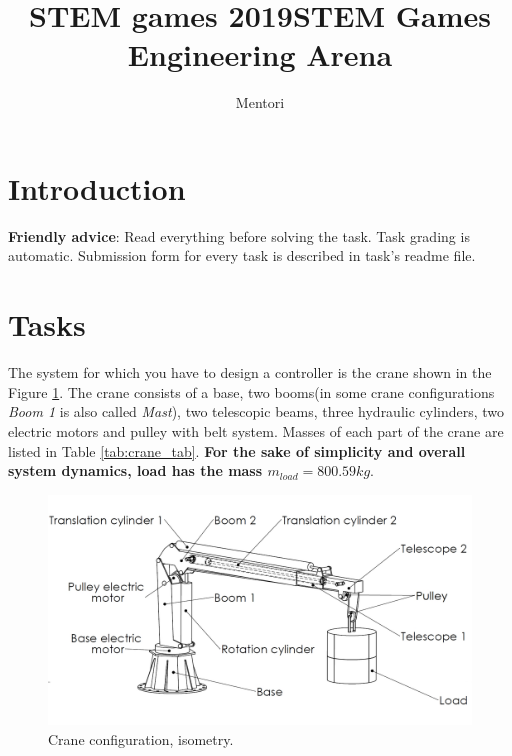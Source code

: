 \documentclass{article}
\title{STEM games 2019}
\author{Mentori}
\title{STEM Games Engineering Arena}
\date{}
\begin{document}
	\maketitle
	
	\section{Introduction}
	
	\noindent 
	\textbf{Friendly advice}: Read everything before solving the task. Task grading is automatic. Submission form for every task is described in task's readme file.
	
	\section{Tasks} \label{sec:tasks}
	
	The system for which you have to design a controller is the crane shown in the Figure \ref{fig:isometry}. The crane consists of a base, two booms(in some crane configurations \textit{Boom 1} is also called \textit{Mast}), two telescopic beams, three hydraulic cylinders, two electric motors and pulley with belt system. Masses of each part of the crane are listed in Table \ref{tab:crane_tab}.\textbf{ For the sake of simplicity and overall system dynamics, load has the mass $m_{load} = 800.59 kg$}.
	
	\begin{figure}[h!]
		\centering
		\includegraphics[width=\textwidth]{kran_teret_izometrija.jpg}
		\caption{Crane configuration, isometry.}
		\label{fig:isometry}
	\end{figure}
	
\end{document}
